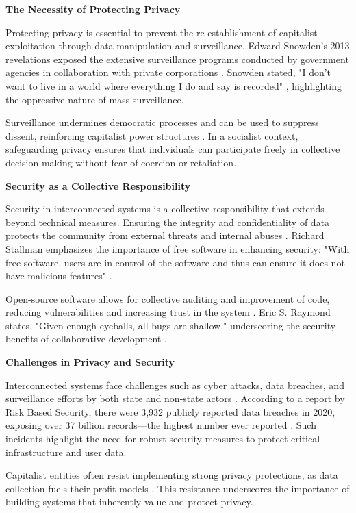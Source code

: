\begin{refsection}
\textbf{The Necessity of Protecting Privacy}

Protecting privacy is essential to prevent the re-establishment of capitalist exploitation through data manipulation and surveillance. Edward Snowden's 2013 revelations exposed the extensive surveillance programs conducted by government agencies in collaboration with private corporations \cite[pp.~3-5]{Snowden2021}. Snowden stated, "I don't want to live in a world where everything I do and say is recorded" \cite[pp.~45]{Snowden2021}, highlighting the oppressive nature of mass surveillance.

Surveillance undermines democratic processes and can be used to suppress dissent, reinforcing capitalist power structures \cite[pp.~85-87]{Fuchs2014}. In a socialist context, safeguarding privacy ensures that individuals can participate freely in collective decision-making without fear of coercion or retaliation.

\textbf{Security as a Collective Responsibility}

Security in interconnected systems is a collective responsibility that extends beyond technical measures. Ensuring the integrity and confidentiality of data protects the community from external threats and internal abuses \cite[pp.~89-91]{Stallman2010}. Richard Stallman emphasizes the importance of free software in enhancing security: "With free software, users are in control of the software and thus can ensure it does not have malicious features" \cite[pp.~73]{Stallman2010}.

Open-source software allows for collective auditing and improvement of code, reducing vulnerabilities and increasing trust in the system \cite[pp.~23-25]{Raymond2022}. Eric S. Raymond states, "Given enough eyeballs, all bugs are shallow," underscoring the security benefits of collaborative development \cite[pp.~30]{Raymond2022}.

\textbf{Challenges in Privacy and Security}

Interconnected systems face challenges such as cyber attacks, data breaches, and surveillance efforts by both state and non-state actors \cite[pp.~45-47]{Krebs2014}. According to a report by Risk Based Security, there were 3,932 publicly reported data breaches in 2020, exposing over 37 billion records—the highest number ever reported \cite[pp.~5-7]{RBS2020}. Such incidents highlight the need for robust security measures to protect critical infrastructure and user data.

Capitalist entities often resist implementing strong privacy protections, as data collection fuels their profit models \cite[pp.~62-64]{Zuboff2020}. This resistance underscores the importance of building systems that inherently value and protect privacy.


\end{refsection}
